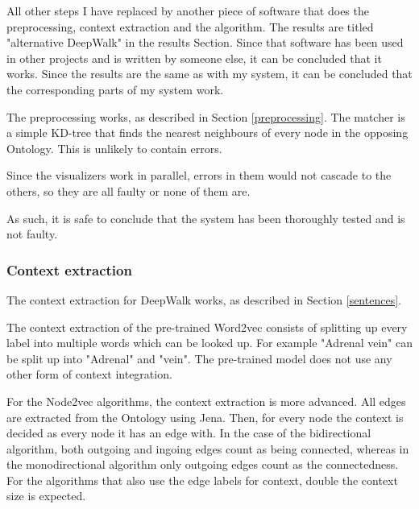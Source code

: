 \documentclass{article}
\begin{document}
  All other steps I have replaced by another piece of software that does the preprocessing, context extraction and the algorithm. The results are titled "alternative DeepWalk" in the results Section. Since that software has been used in other projects and is written by someone else, it can be concluded that it works. Since the results are the same as with my system, it can be concluded that the corresponding parts of my system work.
  
  The preprocessing works, as described in Section \ref{preprocessing}.  The matcher is a simple KD-tree that finds the nearest neighbours of every node in the opposing Ontology. This is unlikely to contain errors.
  
  Since the visualizers work in parallel, errors in them would not cascade to the others, so they are all faulty or none of them are.
  
  As such, it is safe to conclude that the system has been thoroughly tested and is not faulty.
  \subsubsection{Context extraction}
  The context extraction for DeepWalk works, as described in Section \ref{sentences}.
  
  The context extraction of the pre-trained Word2vec consists of splitting up every label into multiple words which can be looked up. For example "Adrenal vein" can be split up into "Adrenal" and "vein".
  The pre-trained model does not use any other form of context integration.
  
  For the Node2vec algorithms, the context extraction is more advanced. All edges are extracted from the Ontology using Jena. Then, for every node the context is decided as every node it has an edge with. In the case of the bidirectional algorithm, both outgoing and ingoing edges count as being connected, whereas in the monodirectional algorithm only outgoing edges count as the connectedness. For the algorithms that also use the edge labels for context, double the context size is expected.
  
\end{document}
